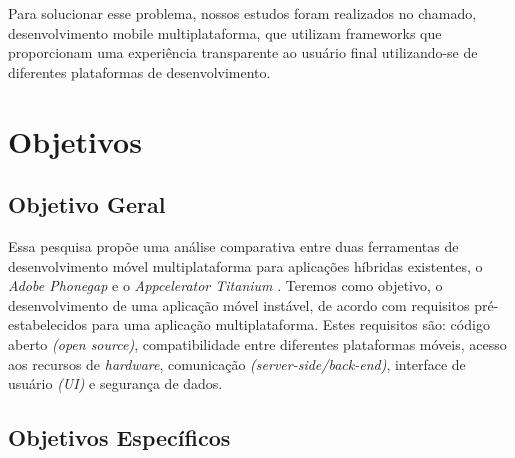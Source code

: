 Para solucionar esse problema, nossos estudos foram realizados no
chamado, desenvolvimento mobile multiplataforma, que utilizam frameworks que
proporcionam uma experiência transparente ao usuário final utilizando-se de
diferentes plataformas de desenvolvimento.

\section{Objetivos}
\label{sec:objetivos}

\subsection{Objetivo Geral}
\label{sec:objetivo-geral}

Essa pesquisa propõe uma análise comparativa entre duas ferramentas de desenvolvimento móvel multiplataforma para aplicações híbridas existentes, o \textit{Adobe Phonegap} \textsuperscript{\texttrademark} e o
\textit{Appcelerator Titanium} \textsuperscript{\texttrademark}. Teremos como
objetivo, o desenvolvimento de uma aplicação móvel instável, de acordo com requisitos
pré-estabelecidos para uma aplicação multiplataforma. Estes requisitos são:
código aberto \textit{(open source)}, compatibilidade entre diferentes plataformas
móveis, acesso aos recursos de \textit{hardware}, comunicação
\textit{(server-side/back-end)}, interface de usuário \textit{(UI)} e segurança
de dados.

\subsection{Objetivos Específicos}
\label{sec:objetivos-especificos}

